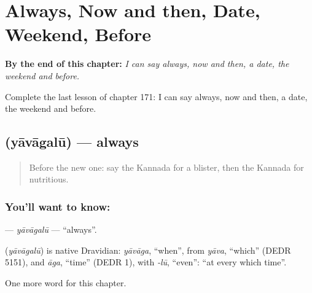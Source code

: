
\chapter{Always, Now and then, Date, Weekend, Before}
\label{ch:ka-always-now-and-then-date-weekend-before}

\begin{chapteropening}
\textbf{By the end of this chapter:} \emph{I can say always, now and then, a date, the weekend and before.}

Complete the last lesson of chapter 171: I can say always, now and then, a date, the weekend and before.
\end{chapteropening}

\section[\texorpdfstring{\kn{ಯಾವಾಗಲೂ} (yāvāgalū)}{ಯಾವಾಗಲೂ (yāvāgalū)}]{ (yāvāgalū) — always}

\label{lesson:KA-C171-yavagalu}



\begin{quote}
Before the new one: say the Kannada for a blister, then the Kannada for nutritious.
\end{quote}

\subsection*{You'll want to know: }
\textbf{} — \emph{yāvāgalū} — \textquotedblleft{}always\textquotedblright{}.

\begin{cousinweb}
\textbf{} (\emph{yāvāgalū}) is native Dravidian: \emph{yāvāga}, \textquotedblleft{}when\textquotedblright{}, from \emph{yāva}, \textquotedblleft{}which\textquotedblright{} (DEDR 5151), and \emph{āga}, \textquotedblleft{}time\textquotedblright{} (DEDR 1), with \emph{-lū}, \textquotedblleft{}even\textquotedblright{}: \textquotedblleft{}at every which time\textquotedblright{}.
\end{cousinweb}

\begin{grammarlens}[title={What you've built}]
One more word for this chapter.
\end{grammarlens}

